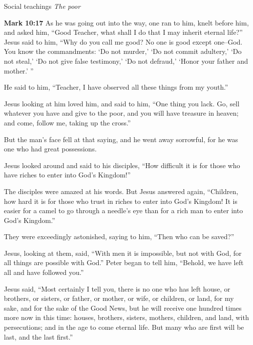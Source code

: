 \documentclass[10pt,twoside]{article} %
\newcommand{\quotesize}{\normalsize{}}
\newenvironment{quotetext}{\begingroup\quotesize}{\endgroup}
\newcommand{\bible}[2]{\begin{quotetext}\textbf{#1} #2\end{quotetext}}
\newcommand{\gospelmark}[2]{\bible{Mark #1}{#2}}
\newcommand{\subhead}[1]{\emph{#1}\par}
\begin{document}
\begin{section}{Social teachings}
\subhead{The poor}

\gospelmark{10:17}{
As he was going out into the way, one ran to him, knelt before him, and asked him, ``Good Teacher, what shall I do that I may inherit eternal life?''
  Jesus said to him, ``Why do you call me good? No one is good except one--God.    You know the commandments: `Do not murder,' `Do not commit adultery,' `Do not steal,' `Do not give false testimony,' `Do not defraud,' `Honor your father and mother.' ''

  He said to him, ``Teacher, I have observed all these things from my youth.''

  Jesus looking at him loved him, and said to him, ``One thing you lack. Go, sell whatever you have and give to the poor, and you will have treasure in heaven; and come, follow me, taking up the cross.''

  But the man's face fell at that saying, and he went away sorrowful, for he was one who had great possessions.

  Jesus looked around and said to his disciples, ``How difficult it is for those who have riches to enter into God's Kingdom!''

  The disciples were amazed at his words. But Jesus answered again, ``Children, how hard it is for those who trust in riches to enter into God's Kingdom!    It is easier for a camel to go through a needle's eye than for a rich man to enter into God's Kingdom.''

  They were exceedingly astonished, saying to him, ``Then who can be saved?''

  Jesus, looking at them, said, ``With men it is impossible, but not with God, for all things are possible with God.'' 
 Peter began to tell him, ``Behold, we have left all and have followed you.''

  Jesus said, ``Most certainly I tell you, there is no one who has left house, or brothers, or sisters, or father, or mother, or wife, or children, or land, for my sake, and for the sake of the Good News,    but he will receive one hundred times more now in this time: houses, brothers, sisters, mothers, children, and land, with persecutions; and in the age to come eternal life.    But many who are first will be last, and the last first.'' }

\end{section}
\end{document}
